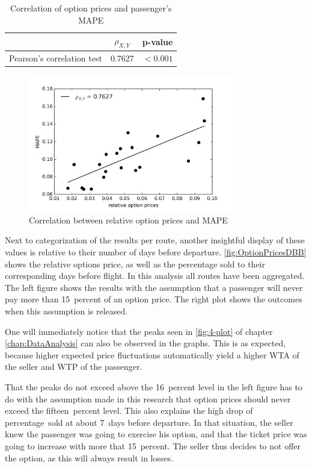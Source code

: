 

\begin{table}
\centering
\begin{tabular}{l c c}
\toprule
~  &  $\rho_{X,Y}$  &  p-value   \\
\midrule
Pearson's correlation test &  0.7627  &  $< 0.001$ \\
\bottomrule
\end{tabular}
\caption{Correlation of option prices and passenger's MAPE}
\label{tbl:pearsonPricesMAPE}
\end{table}


\begin{figure}
    \centering
    \includegraphics[width=0.8\textwidth]{figures/correlation_optionPrices-MAPE}
    \caption{Correlation between relative option prices and MAPE}
    \label{fig:optionPricesMAPE}
\end{figure}


Next to categorization of the results per route, another insightful display of these values is relative to their number of days before departure. \autoref{fig:OptionPricesDBB} shows the relative options price, as well as the percentage sold to their corresponding days before flight. In this analysis all routes have been aggregated. The left figure shows the results with the assumption that a passenger will never pay more than 15~percent of an option price. The right plot shows the outcomes when this assumption is released.

One will immediately notice that the peaks seen in \autoref{fig:4-plot} of chapter \autoref{chap:DataAnalysis} can also be observed in the graphs. This is as expected, because higher expected price fluctuations automatically yield a higher WTA of the seller and WTP of the passenger.

That the peaks do not exceed above the 16~percent level in the left figure has to do with the assumption made in this research that option prices should never exceed the fifteen~percent level. This also explains the high drop of percentage~sold at about 7~days before departure. In that situation, the seller knew the passenger was going to exercise his option, and that the ticket price was going to increase with more that 15~percent. The seller thus decides to not offer the option, as this will always result in losses.

